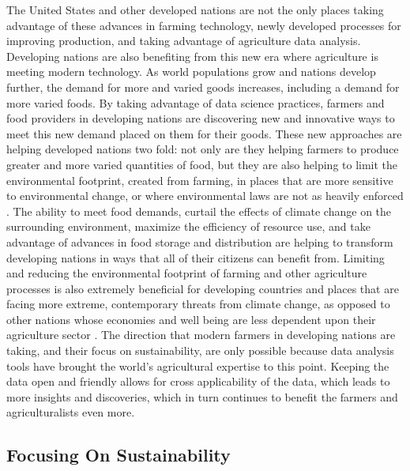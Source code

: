 \documentclass[sigconf]{acmart}
\begin{document}
The United States and other developed nations are not the only places taking advantage of these advances in farming technology, newly developed processes for improving production, and taking advantage of agriculture data analysis. Developing nations are also benefiting from this new era where agriculture is meeting modern technology. As world populations grow and nations develop further, the demand for more and varied goods increases, including a demand for more varied foods. By taking advantage of data science practices, farmers and food providers in developing nations are discovering new and innovative ways to meet this new demand placed on them for their goods. These new approaches are helping developed nations two fold: not only are they helping farmers to produce greater and more varied quantities of food, but they are also helping to limit the environmental footprint, created from farming, in places that are more sensitive to environmental change, or where environmental laws are not as heavily enforced \cite{garnett2013}. The ability to meet food demands, curtail the effects of climate change on the surrounding environment, maximize the efficiency of resource use, and take advantage of advances in food storage and distribution are helping to transform developing nations in ways that all of their citizens can benefit from. Limiting and reducing the environmental footprint of farming and other agriculture processes is also extremely beneficial for developing countries and places that are facing more extreme, contemporary threats from climate change, as opposed to other nations whose economies and well being are less dependent upon their agriculture sector \cite{garnett2013}. The direction that modern farmers in developing nations are taking, and their focus on sustainability, are only possible because data analysis tools have brought the world's agricultural expertise to this point. Keeping the data open and friendly allows for cross applicability of the data, which leads to more insights and discoveries, which in turn continues to benefit the farmers and agriculturalists even more.

\subsection{Focusing On Sustainability}
\end{document}
